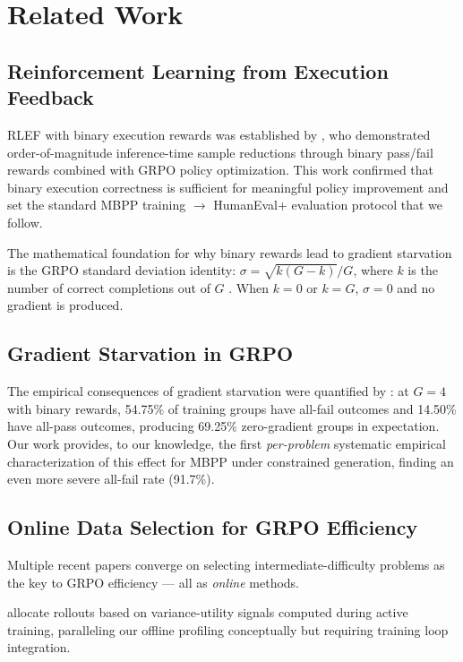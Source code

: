 \section{Related Work}

\subsection{Reinforcement Learning from Execution Feedback}

RLEF with binary execution rewards was established by \citet{Gehring2024RLEF}, who demonstrated order-of-magnitude inference-time sample reductions through binary pass/fail rewards combined with GRPO policy optimization. This work confirmed that binary execution correctness is sufficient for meaningful policy improvement and set the standard MBPP training $\to$ HumanEval+ evaluation protocol that we follow.

The mathematical foundation for why binary rewards lead to gradient starvation is the GRPO standard deviation identity: $\sigma = \sqrt{k(G-k)}/G$, where $k$ is the number of correct completions out of $G$ \citep{BayYearickLab2025GRPOIdentity}. When $k=0$ or $k=G$, $\sigma=0$ and no gradient is produced.

\subsection{Gradient Starvation in GRPO}

The empirical consequences of gradient starvation were quantified by \citet{Nie2026GradientStarvation}: at $G=4$ with binary rewards, 54.75\% of training groups have all-fail outcomes and 14.50\% have all-pass outcomes, producing 69.25\% zero-gradient groups in expectation. Our work provides, to our knowledge, the first \textit{per-problem} systematic empirical characterization of this effect for MBPP under constrained generation, finding an even more severe all-fail rate (91.7\%).

\subsection{Online Data Selection for GRPO Efficiency}

Multiple recent papers converge on selecting intermediate-difficulty problems as the key to GRPO efficiency --- all as \textit{online} methods.

\citet{Jiang2026VIGOR} allocate rollouts based on variance-utility signals computed during active training, paralleling our offline profiling conceptually but requiring training loop integration.


